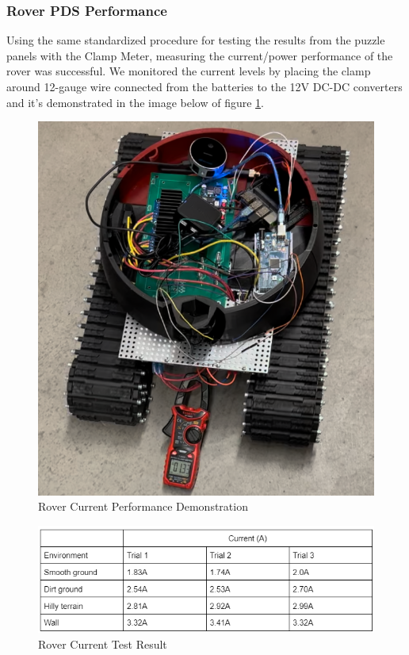\documentclass[a4paper, 10pt]{article}
\begin{document}
\subsubsection*{Rover PDS Performance}	

	Using the same standardized procedure for testing the results from the puzzle panels with the Clamp Meter, measuring the current/power performance of the rover was successful. We monitored the current levels by placing the clamp around 12-gauge wire connected from the batteries to the 12V DC-DC converters and it's demonstrated in the image below of figure \ref{Rover Current Performance}.

\begin{figure} [!h]
			\centering
			\includegraphics[scale=0.6]{Photos/Clamp Meter Demo}
			\caption{Rover Current Performance Demonstration}
			\label{Rover Current Performance}
		\end{figure}

\begin{figure} [!h]
			\centering
			\includegraphics[scale=0.8]{Photos/Rover current test}
			\caption{Rover Current Test Result}
			\label{Rover test}
		\end{figure}
\end{document}
